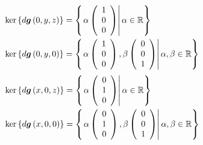 \documentclass[aps,preprint]{revtex4}%
\begin{document}
\begin{align*}
\ker\left\{  d\boldsymbol{g}\left(  0,y,z\right)  \right\}   &  =\left\{
\left.  \alpha\left(
\begin{array}
[c]{c}%
1\\
0\\
0
\end{array}
\right)  \right\vert \alpha\in\mathbb{R}\right\} \\
\ker\left\{  d\boldsymbol{g}\left(  0,y,0\right)  \right\}   &  =\left\{
\left.  \alpha\left(
\begin{array}
[c]{c}%
1\\
0\\
0
\end{array}
\right)  ,\beta\left(
\begin{array}
[c]{c}%
0\\
0\\
1
\end{array}
\right)  \right\vert \alpha,\beta\in\mathbb{R}\right\}
\end{align*}%
\begin{align*}
\ker\left\{  d\boldsymbol{g}\left(  x,0,z\right)  \right\}   &  =\left\{
\left.  \alpha\left(
\begin{array}
[c]{c}%
0\\
1\\
0
\end{array}
\right)  \right\vert \alpha\in\mathbb{R}\right\} \\
\ker\left\{  d\boldsymbol{g}\left(  x,0,0\right)  \right\}   &  =\left\{
\left.  \alpha\left(
\begin{array}
[c]{c}%
0\\
1\\
0
\end{array}
\right)  ,\beta\left(
\begin{array}
[c]{c}%
0\\
0\\
1
\end{array}
\right)  \right\vert \alpha,\beta\in\mathbb{R}\right\}
\end{align*}%
\end{document}
